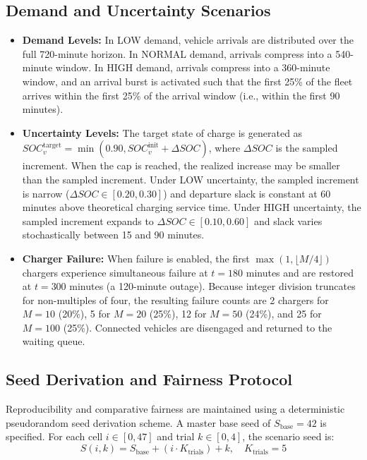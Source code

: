 \documentclass[conference]{IEEEtran}
\begin{document}
\subsection{Demand and Uncertainty Scenarios}
\begin{itemize}
    \item \textbf{Demand Levels:} In LOW demand, vehicle arrivals are distributed over the full 720-minute horizon. In NORMAL demand, arrivals compress into a 540-minute window. In HIGH demand, arrivals compress into a 360-minute window, and an arrival burst is activated such that the first 25\% of the fleet arrives within the first 25\% of the arrival window (i.e., within the first 90 minutes).
    \item \textbf{Uncertainty Levels:} The target state of charge is generated as $SOC_v^{\mathrm{target}} = \min(0.90, SOC_v^{\mathrm{init}} + \Delta SOC)$, where $\Delta SOC$ is the sampled increment. When the cap is reached, the realized increase may be smaller than the sampled increment. Under LOW uncertainty, the sampled increment is narrow ($\Delta SOC \in [0.20, 0.30]$) and departure slack is constant at 60 minutes above theoretical charging service time. Under HIGH uncertainty, the sampled increment expands to $\Delta SOC \in [0.10, 0.60]$ and slack varies stochastically between 15 and 90 minutes.
    \item \textbf{Charger Failure:} When failure is enabled, the first $\max(1, \lfloor M / 4 \rfloor)$ chargers experience simultaneous failure at $t = 180$ minutes and are restored at $t = 300$ minutes (a 120-minute outage). Because integer division truncates for non-multiples of four, the resulting failure counts are 2 chargers for $M = 10$ (20\%), 5 for $M = 20$ (25\%), 12 for $M = 50$ (24\%), and 25 for $M = 100$ (25\%). Connected vehicles are disengaged and returned to the waiting queue.
\end{itemize}

\subsection{Seed Derivation and Fairness Protocol}
Reproducibility and comparative fairness are maintained using a deterministic pseudorandom seed derivation scheme. A master base seed of $S_{\mathrm{base}} = 42$ is specified. For each cell $i \in [0, 47]$ and trial $k \in [0, 4]$, the scenario seed is:
\begin{equation}
S(i, k) = S_{\mathrm{base}} + (i \cdot K_{\mathrm{trials}}) + k, \quad K_{\mathrm{trials}} = 5
\end{equation}
\end{document}
